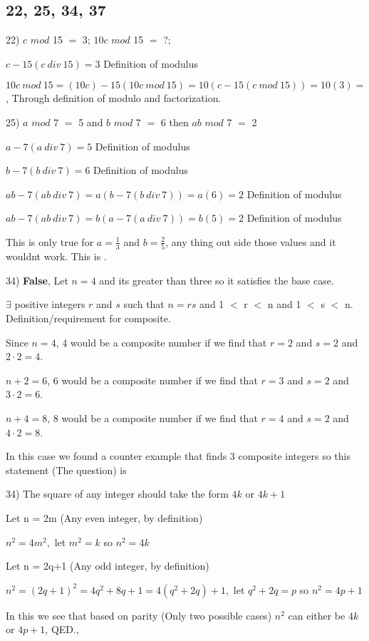 \documentclass[11pt]{article}
\newcommand*{\mybox}[1]{\framebox{#1}}
\begin{document}
\subsection{22, 25, 34, 37}
\begin{flushleft}

22) $c$ $mod$ 15 $=$ 3; $10c$ $mod$ 15 $=$ ?;

$c-15(c\ div\ 15)=3$ Definition of modulus

$10c\ mod\ 15 = (10c)-15(10c\ mod\ 15) = 10(c-15(c\ mod\ 15)) =  10(3) = $\mybox{ $30$ }, Through definition of modulo and factorization.

\hrulefill

25) $a$ $mod$ 7 $=$ 5 and $b$ $mod$ 7 $=$ 6 then $ab$ $mod$ 7 $=$ 2

$a-7(a\ div\ 7)=5$ Definition of modulus

$b-7(b\ div\ 7)=6$ Definition of modulus

$ab-7(ab\ div\ 7)=a(b-7(b\ div\ 7)) = a(6) = 2$ Definition of modulus

$ab-7(ab\ div\ 7)=b(a-7(a\ div\ 7)) = b(5) = 2$ Definition of modulus

This is only true for $a=\frac{1}{3}$ and $b=\frac{2}{5}$, any thing out side those values and it wouldnt work. This is \mybox{False}.

\hrulefill

34) \textbf{False}, Let $n=4$ and its greater than three so it satisfies the base case.

$\exists$ positive integers $r$ and $s$ such that $n = rs$ and 1 $<$ r $<$ n and 1 $<$ s $<$ n. Definition/requirement for composite.

Since $n=4$, 4 would be a composite number if we find that $r=2$ and $s=2$ and $2\cdot 2 = 4$. 

$n+2=6$, 6 would be a composite number if we find that $r=3$ and $s=2$ and $3\cdot 2 = 6$. 

$n+4=8$, 8 would be a composite number if we find that $r=4$ and $s=2$ and $4\cdot 2 = 8$. 

In this case we found a counter example that finds 3 composite integers so this statement (The question) is \mybox{False.}

\hrulefill

34) The square of any integer should take the form $4k$ or $4k+1$

Let n = 2m (Any even integer, by definition)

$n^2 = 4m^2,$ let $m^2 = k$ so $n^2 = 4k$

Let n = 2q+1 (Any odd integer, by definition)

$n^2 = (2q+1)^2 = 4q^2 + 8q + 1 = 4(q^2 + 2q) + 1,$ let $q^2 + 2q = p$ so $n^2 = 4p+1$

In this we see that based on parity (Only two possible cases) $n^2$ can either be $4k$ or $4p+1$, QED., \mybox{True}


\hrulefill

\newpage
\end{flushleft}
\end{document}
